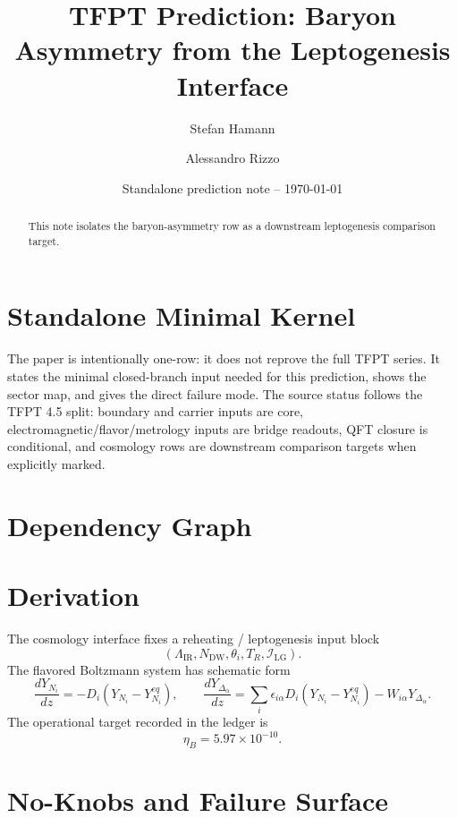 \documentclass[11pt,a4paper]{article}
\title{\color{tfptblue}\textbf{TFPT Prediction: Baryon Asymmetry from the Leptogenesis Interface}}
\author{Stefan Hamann \and Alessandro Rizzo}
\date{{\normalsize\color{tfptgray}\sffamily Standalone prediction note -- \today}}
\begin{document}
\maketitle

\begin{abstract}
This note isolates the baryon-asymmetry row as a downstream leptogenesis comparison target.
\end{abstract}



\section{Standalone Minimal Kernel}
\MinimalKernelBox

The paper is intentionally one-row: it does not reprove the full TFPT series. It states the minimal closed-branch input needed for this prediction, shows the sector map, and gives the direct failure mode. The source status follows the TFPT 4.5 split: boundary and carrier inputs are core, electromagnetic/flavor/metrology inputs are bridge readouts, QFT closure is conditional, and cosmology rows are downstream comparison targets when explicitly marked.


\section{Dependency Graph}

\section{Derivation}

The cosmology interface fixes a reheating / leptogenesis input block
\[
(\Lambda_{\mathrm{IR}},N_{\mathrm{DW}},\theta_i,T_R,\mathcal I_{\mathrm{LG}}).
\]
The flavored Boltzmann system has schematic form
\[
\frac{dY_{N_i}}{dz}=-D_i(Y_{N_i}-Y_{N_i}^{eq}),
\qquad
\frac{dY_{\Delta_\alpha}}{dz}=\sum_i\epsilon_{i\alpha}D_i(Y_{N_i}-Y_{N_i}^{eq})-W_{i\alpha}Y_{\Delta_\alpha}.
\]
The operational target recorded in the ledger is
\[
\eta_B=5.97\times10^{-10}.
\]


\section{No-Knobs and Failure Surface}
\end{document}
